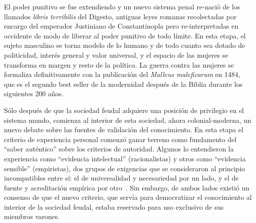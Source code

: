 \documentclass[a4paper,10pt]{book}
\theoremstyle{definition}
\begin{document}
El poder punitivo se fue extendiendo y un nuevo sistema penal re-nació de los llamados \emph{libris terribilis} del Digesto, antiguas leyes romanas recolectadas por encargo del emperador Justiniano de Constantinopla pero re-interpretadas en occidente de modo de liberar al poder punitivo de todo límite.
En esta etapa, el sujeto masculino se torna modelo de lo humano y de todo cuanto sea dotado de politicidad, interés general y valor universal, y el espacio de las mujeres se transforma en margen y resto de la política.
La guerra contra las mujeres se formaliza definitivamente con la publicación del \emph{Malleus maleficarum} en 1484, que es el segundo best seller de la modernidad después de la Biblia durante los siguientes 200 años.


Sólo después de que la sociedad feudal adquiere una posición de privilegio en el sistema mundo, comienza al interior de esta sociedad, ahora colonial-moderna, un nuevo debate sobre las fuentes de validación del conocimiento.
En esta etapa el criterio de experiencia personal comenzó ganar terreno como fundamento del ``saber auténtico'' sobre los criterios de autoridad.
Algunos lo entendieron la experiencia como ``evidencia intelectual'' (racionalistas) y otros como ``evidencia sensible'' (empiristas), dos grupos de exigencias que se consideraron al principio incompatibles entre sí: el de universalidad y necesariedad por un lado, y el de fuente y acreditación empírica por otro~\cite{samaja1999-epistemologiaYMetodologia}.
Sin embargo, de ambos lados existió un consenso de que el nuevo criterio, que servía para democratizar el conocimiento al interior de la sociedad feudal, estaba reservado para uso exclusivo de sus miembros varones.

\end{document}
